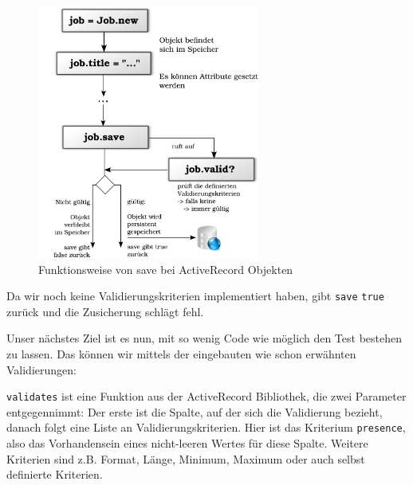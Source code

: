 \begin{figure}[hbp]
 \centering
 \includegraphics[width=0.65\textwidth]{./diagrams/activerecord-save.pdf}
 \caption{Funktionsweise von save bei ActiveRecord Objekten}
 \label{fig:activerecordsave}
\end{figure}

Da wir noch keine Validierungskriterien implementiert haben, gibt \texttt{save} \texttt{true} zurück und die Zusicherung schlägt fehl.

Unser nächstes Ziel ist es nun, mit so wenig Code wie möglich den Test bestehen zu lassen. Das können wir mittels der eingebauten wie schon erwähnten Validierungen:

\begin{ruby}[label=app/models/job.rb]
   
      
\end{ruby}
\texttt{validates} ist eine Funktion aus der ActiveRecord Bibliothek, die zwei Parameter entgegennimmt: Der erste ist die Spalte, auf der sich die Validierung bezieht, danach folgt eine Liste an Validierungskriterien. Hier ist das Kriterium \texttt{presence}, also das Vorhandensein eines nicht-leeren Wertes für diese Spalte. Weitere Kriterien sind z.B. Format, Länge, Minimum, Maximum oder auch selbst definierte Kriterien.

